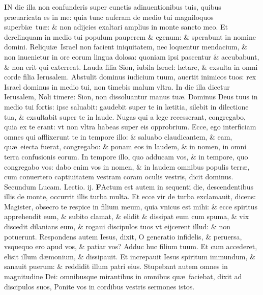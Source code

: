\documentclass[a5paper,10pt]{book}
\def\leftmarginnote{%
	\lrmarginnote{\hskip -\marginparsep \hskip -6.5em}}
\def\rightmarginnote{%
	\lrmarginnote{\hskip\columnwidth \hskip -1em}}
\def\ae{æ}
\begin{document}
\begin{multicols*}{2}
\vspace{-.25em}
\lettrine[lines=2]{\bfseries I}{}N\rightmarginnote{ca. 3.} die illa non confunderis super cunctis adinuentionibus tuis, quibus pr\ae uaricata es in me: quia tunc auferam de medio tui magniloquos superbi\ae \ tu\ae : \& non adijcies exaltari amplius in monte sancto meo.
Et derelinquam in medio tui populum pauperem \& egenum: \& sperabunt in nomine domini.
Reliqui\ae \ Israel non facient iniquitatem, nec loquentur mendacium, \& non inuenietur in ore eorum lingua dolosa: quoniam ipsi pascentur \& accubabunt, \& non erit qui exterreat.
Lauda filia Sion, iubila Israel: l\ae tare, \& exsulta in omni corde filia Ierusalem.
Abstulit dominus iudicium tuum, auertit inimicos tuos: rex Israel dominus in medio tui, non timebis malum vltra.
In die illa dicetur Ierusalem, Noli timere: Sion, non dissoluantur manus tu\ae .
Dominus Deus tuus in medio tui fortis: ipse saluabit: gaudebit super te in l\ae titia, silebit in dilectione tua, \& exsultabit super te in laude.
Nugas qui a lege recesserant, congregabo, quia ex te erant: vt non vltra habeas super eis opprobrium.
Ecce, ego interficiam omnes qui afflixerunt te in tempore illo: \& saluabo claudicantem, \& eam, qu\ae \ eiecta fuerat, congregabo: \& ponam eos in laudem, \& in nomen, in omni terra confusionis eorum.
In tempore illo,
quo adducam vos, \& in tempore, quo congregabo vos: dabo enim vos in nomen, \& in laudem omnibus populis terr\ae , cum conuertero captiuitatem vestram coram oculis vestris, dicit dominus.
\newline \color{red} Secundum Lucam. \hfill Lectio. ij. \color{black}
\vspace{-.25em}
\lettrine[lines=2]{\bfseries \color{red} F}{}Actum\leftmarginnote{\begin{flushright}ca. 9.\end{flushright}} est autem in sequenti die, descendentibus illis de monte, occurrit illis turba multa.
Et ecce vir de turba exclamauit, dicens: Magister, obsecro te respice in filium meum, quia vnicus est mihi: \& ecce spiritus apprehendit eum, \& subito clamat, \& elidit \& dissipat eum cum spuma, \& vix discedit dilanians eum, \& rogaui discipulos tuos vt eijcerent illud: \& non potuerunt.
Respondens autem Iesus, dixit, O generatio infidelis, \& peruersa, vsquequo ero apud vos, \& patiar vos?
Adduc huc filium tuum. Et cum accederet, elisit illum d\ae monium, \& dissipauit.
Et increpauit Iesus spiritum immundum, \& sanauit puerum: \& reddidit illum patri eius.
Stupebant autem omnes in magnitudine Dei: omnibusque mirantibus in omnibus qu\ae \ faciebat, dixit ad discipulos suos, Ponite vos in cordibus vestris sermones istos.

\end{multicols*}
\end{document}
